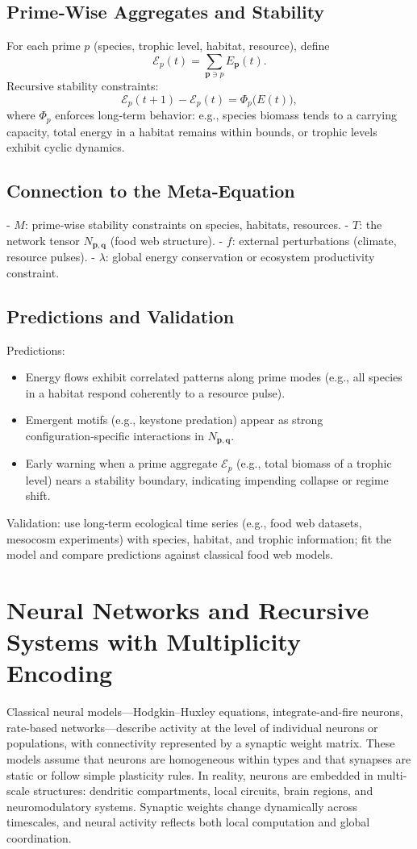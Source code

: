 \documentclass[11pt]{article}
\begin{document}
\subsection{Prime‑Wise Aggregates and Stability}
For each prime \(p\) (species, trophic level, habitat, resource), define
\[
\mathcal{E}_p(t) = \sum_{\mathbf{p} \ni p} E_{\mathbf{p}}(t).
\]
Recursive stability constraints:
\[
\mathcal{E}_p(t+1) - \mathcal{E}_p(t) = \Phi_p\big(E(t)\big),
\]
where \(\Phi_p\) enforces long‑term behavior: e.g., species biomass tends to a carrying capacity, total energy in a habitat remains within bounds, or trophic levels exhibit cyclic dynamics.

\subsection{Connection to the Meta‑Equation}
- \(M\): prime‑wise stability constraints on species, habitats, resources.
- \(T\): the network tensor \(N_{\mathbf{p},\mathbf{q}}\) (food web structure).
- \(f\): external perturbations (climate, resource pulses).
- \(\lambda\): global energy conservation or ecosystem productivity constraint.

\subsection{Predictions and Validation}
Predictions:
\begin{itemize}
    \item Energy flows exhibit correlated patterns along prime modes (e.g., all species in a habitat respond coherently to a resource pulse).
    \item Emergent motifs (e.g., keystone predation) appear as strong configuration‑specific interactions in \(N_{\mathbf{p},\mathbf{q}}\).
    \item Early warning when a prime aggregate \(\mathcal{E}_p\) (e.g., total biomass of a trophic level) nears a stability boundary, indicating impending collapse or regime shift.
\end{itemize}
Validation: use long‑term ecological time series (e.g., food web datasets, mesocosm experiments) with species, habitat, and trophic information; fit the model and compare predictions against classical food web models.

\section{Neural Networks and Recursive Systems with Multiplicity Encoding}
Classical neural models---Hodgkin--Huxley equations, integrate-and-fire neurons, rate-based networks---describe activity at the level of individual neurons or populations, with connectivity represented by a synaptic weight matrix. These models assume that neurons are homogeneous within types and that synapses are static or follow simple plasticity rules. In reality, neurons are embedded in multi-scale structures: dendritic compartments, local circuits, brain regions, and neuromodulatory systems. Synaptic weights change dynamically across timescales, and neural activity reflects both local computation and global coordination.
\end{document}
